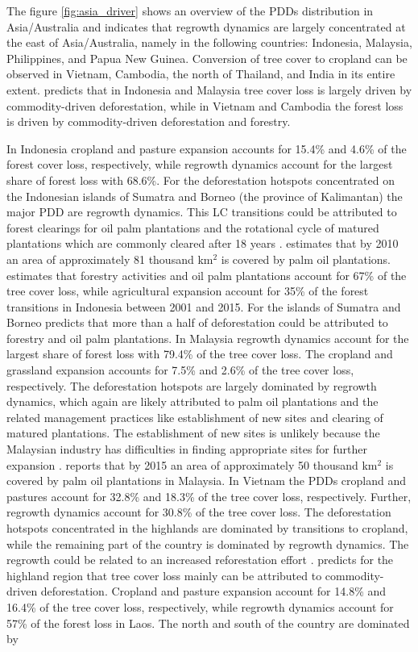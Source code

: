 			The figure \ref{fig:asia_driver} shows an overview of the \acp{PDD} distribution in Asia/Australia and indicates that regrowth dynamics are largely concentrated at the east of Asia/Australia, namely in the following countries: Indonesia, Malaysia, Philippines, and Papua New Guinea. Conversion of tree cover to cropland can be observed in Vietnam, Cambodia, the north of Thailand, and India in its entire extent. \citet{Curtis2018} predicts that in Indonesia and Malaysia tree cover loss is largely driven by commodity-driven deforestation, while in Vietnam and Cambodia the forest loss is driven by commodity-driven deforestation and forestry. 

			In Indonesia cropland and pasture expansion accounts for 15.4\% and 4.6\% of the forest cover loss, respectively, while regrowth dynamics account for the largest share of forest loss with 68.6\%. For the deforestation hotspots concentrated on the Indonesian islands of Sumatra and Borneo (the province of Kalimantan) the major \ac{PDD} are regrowth dynamics. This \ac{LC} transitions could be attributed to forest clearings for oil palm plantations and the rotational cycle of matured plantations which are commonly cleared after 18 years \citep{Corley2016}. \citet{Corley2016} estimates that by 2010 an area of approximately 81 thousand km$^2$ is covered by palm oil plantations. \citet{Austin2019} estimates that forestry activities and oil palm plantations account for 67\% of the tree cover loss, while agricultural expansion account for 35\% of the forest transitions in Indonesia between 2001 and 2015. For the islands of Sumatra and Borneo \citet{Austin2019} predicts that more than a half of deforestation could be attributed to forestry and oil palm plantations. In Malaysia regrowth dynamics account for the largest share of forest loss with 79.4\% of the tree cover loss. The cropland and grassland expansion accounts for 7.5\% and 2.6\% of the tree cover loss, respectively. The deforestation hotspots are largely dominated by regrowth dynamics, which again are likely attributed to palm oil plantations and the related management practices like establishment of new sites and clearing of matured plantations. The establishment of new sites is unlikely because the Malaysian industry has difficulties in finding appropriate sites for further expansion \citep{Corley2016}. \citet{Corley2016} reports that by 2015 an area of approximately 50 thousand km$^2$ is covered by palm oil plantations in Malaysia. In Vietnam the \acp{PDD} cropland and pastures account for 32.8\% and 18.3\% of the tree cover loss, respectively. Further, regrowth dynamics account for 30.8\% of the tree cover loss. The deforestation hotspots concentrated in the highlands are dominated by transitions to cropland, while the remaining part of the country is dominated by regrowth dynamics. The regrowth could be related to an increased reforestation effort \citep{Chazdon2008}. \citet{Curtis2018} predicts for the highland region that tree cover loss mainly can be attributed to commodity-driven deforestation. Cropland and pasture expansion account for 14.8\% and 16.4\% of the tree cover loss, respectively, while regrowth dynamics account for 57\% of the forest loss in Laos. The north and south of the country are dominated by 